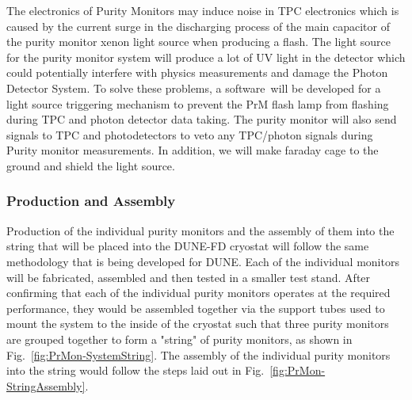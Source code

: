 The electronics of Purity Monitors may induce noise in TPC electronics which is caused by the current surge in the discharging process of the main capacitor of the purity monitor xenon light source when producing a flash.  The light source for the purity monitor system will produce a lot of UV light in the detector which could potentially interfere with physics measurements and damage the Photon Detector System. To solve these problems, a software will be developed for a light source triggering mechanism to prevent the PrM flash lamp from flashing during TPC and photon detector data taking. The purity monitor will also send signals to TPC and photodetectors to veto any TPC/photon signals during Purity monitor measurements. In addition, we will make faraday cage to the ground and shield the light source.



\subsubsection{Production and Assembly}
\label{sec:PrMon-Production-Assembly}
Production of the individual purity monitors and the assembly of them into the string that will be placed into the DUNE-FD cryostat will follow the same methodology that is being developed for DUNE.  Each of the individual monitors will be fabricated, assembled and then tested in a smaller test stand.  After confirming that each of the individual purity monitors operates at the required performance, they would be assembled together via the support tubes used to mount the system to the inside of the cryostat such that three purity monitors are grouped together to form a "string" of purity monitors, as shown in Fig.~\ref{fig:PrMon-SystemString}.  The assembly of the individual purity monitors into the string would follow the steps laid out in Fig.~\ref{fig:PrMon-StringAssembly}.  


